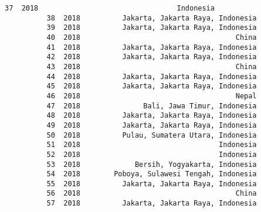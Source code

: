 \documentclass[11pt]{article}
\begin{document}
\begin{Verbatim}[commandchars=\\\{\}]
          37  2018                                 Indonesia   
          38  2018          Jakarta, Jakarta Raya, Indonesia   
          39  2018          Jakarta, Jakarta Raya, Indonesia   
          40  2018                                     China   
          41  2018          Jakarta, Jakarta Raya, Indonesia   
          42  2018          Jakarta, Jakarta Raya, Indonesia   
          43  2018                                     China   
          44  2018          Jakarta, Jakarta Raya, Indonesia   
          45  2018          Jakarta, Jakarta Raya, Indonesia   
          46  2018                                     Nepal   
          47  2018               Bali, Jawa Timur, Indonesia   
          48  2018          Jakarta, Jakarta Raya, Indonesia   
          49  2018          Jakarta, Jakarta Raya, Indonesia   
          50  2018          Pulau, Sumatera Utara, Indonesia   
          51  2018                                 Indonesia   
          52  2018                                 Indonesia   
          53  2018             Bersih, Yogyakarta, Indonesia   
          54  2018        Poboya, Sulawesi Tengah, Indonesia   
          55  2018          Jakarta, Jakarta Raya, Indonesia   
          56  2018                                     China   
          57  2018          Jakarta, Jakarta Raya, Indonesia   
          

\end{Verbatim}
\end{document}
